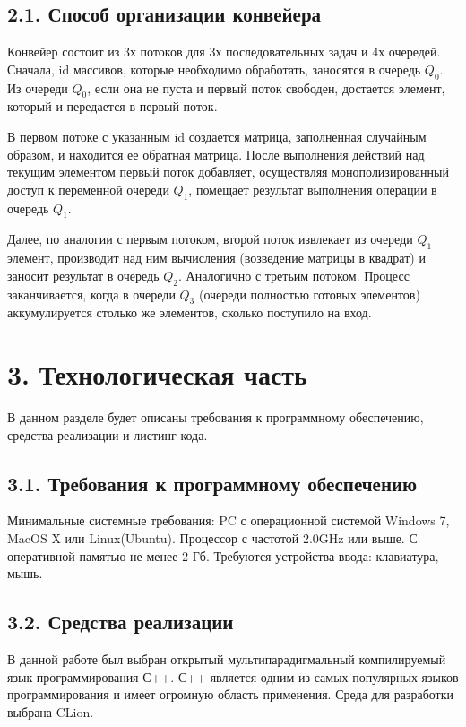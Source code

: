 \documentclass[a4paper,12pt]{article}
\begin{document}
\subsection*{2.1. Способ организации конвейера}
Конвейер состоит из 3х потоков для 3х последовательных задач и 4х очередей. Сначала, id массивов, которые необходимо обработать, заносятся в очередь ${Q_0}$. Из очереди ${Q_0}$, если она не пуста и первый поток свободен, достается элемент, который и передается в первый поток. 

В первом потоке с указанным id создается матрица, заполненная случайным образом, и находится ее обратная матрица. После выполнения действий над текущим элементом первый поток добавляет, осуществляя монополизированный доступ к переменной очереди ${Q_1}$, помещает результат выполнения операции в очередь ${Q_1}$. 

Далее, по аналогии с первым потоком, второй поток извлекает из очереди ${Q_1}$ элемент, производит над ним вычисления (возведение матрицы в квадрат) и заносит результат в очередь ${Q_2}$. Аналогично с третьим потоком.
Процесс заканчивается, когда в очереди ${Q_3}$ (очереди полностью готовых элементов) аккумулируется столько же элементов, сколько поступило на вход. \\


\newpage
\section*{3. Технологическая часть}

В данном разделе будет описаны требования к программному обеспечению, средства реализации и листинг кода.

\subsection*{3.1. Требования к программному обеспечению}
Минимальные системные требования: PC с операционной системой  Windows 7, MacOS X или Linux(Ubuntu). Процессор с частотой 2.0GHz или выше. С оперативной памятью не менее 2 Гб. Требуются устройства ввода: клавиатура, мышь.

\subsection*{3.2. Средства реализации}
В данной работе был выбран открытый мультипарадигмальный компилируемый язык программирования С++. С++ является одним из самых популярных языков программирования и имеет огромную область применения. Среда для разработки выбрана CLion.
\end{document}
